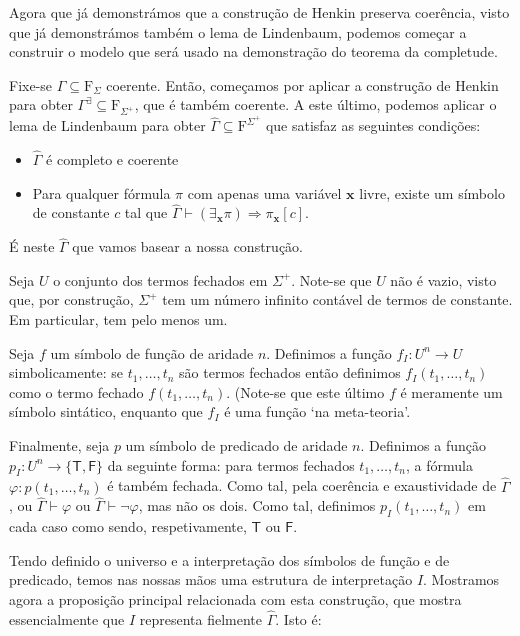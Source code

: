 \documentclass{report}
\theoremstyle{definition}
\theoremstyle{remark}
\renewcommand{\bf}[1]{\mathbf{#1}}
\newcommand{\F}{\mathrm{F}}
\newcommand{\lt}{\mathsf{T}}
\newcommand{\lf}{\mathsf{F}}
\newcommand{\imply}{\mathbin{\Rightarrow}}
\begin{document}
	Agora que já demonstrámos que a construção de Henkin preserva coerência, visto que já demonstrámos também o lema de Lindenbaum, podemos começar a construir o modelo que será usado na demonstração do teorema da completude.
	
	Fixe-se $\Gamma \subseteq \F_\Sigma$ coerente. Então, começamos por aplicar a construção de Henkin para obter $\Gamma^\exists \subseteq \F_{\Sigma^+}$, que é também coerente. A este último, podemos aplicar o lema de Lindenbaum para obter $\widehat\Gamma \subseteq \F^{\Sigma^+}$ que satisfaz as seguintes condições:
	
	\begin{itemize}
	\item $\widehat\Gamma$ é completo e coerente
	
	\item Para qualquer fórmula $\pi$ com apenas uma variável $\bf x$ livre, existe um símbolo de constante $c$ tal que $\widehat\Gamma \vdash (\exists_{\bf x} \pi) \imply \pi_{\bf x}[c]$.
	\end{itemize}
	
	É neste $\widehat\Gamma$ que vamos basear a nossa construção.
	
	Seja $U$ o conjunto dos termos fechados em $\Sigma^+$. Note-se que $U$ não é vazio, visto que, por construção, $\Sigma^+$ tem um número infinito contável de termos de constante. Em particular, tem pelo menos um.
	
	Seja $f$ um símbolo de função de aridade $n$. Definimos a função $f_I : U^n \to U$ simbolicamente: se $t_1, \dots, t_n$ são termos fechados então definimos $f_I(t_1, \dots, t_n)$ como o termo fechado $f(t_1, \dots, t_n)$. (Note-se que este último $f$ é meramente um símbolo sintático, enquanto que $f_I$ é uma função `na meta-teoria'.
	
	Finalmente, seja $p$ um símbolo de predicado de aridade $n$. Definimos a função $p_I : U^n \to \{\lt, \lf\}$ da seguinte forma: para termos fechados $t_1, \dots, t_n$, a fórmula $\varphi : p(t_1, \dots, t_n)$ é também fechada. Como tal, pela coerência e exaustividade de $\widehat\Gamma$, ou $\widehat\Gamma \vdash \varphi$ ou $\widehat\Gamma \vdash \neg\varphi$, mas não os dois. Como tal, definimos $p_I(t_1, \dots, t_n)$ em cada caso como sendo, respetivamente, $\lt$ ou $\lf$.
	
	Tendo definido o universo e a interpretação dos símbolos de função e de predicado, temos nas nossas mãos uma estrutura de interpretação $I$. Mostramos agora a proposição principal relacionada com esta construção, que mostra essencialmente que $I$ representa fielmente $\widehat\Gamma$. Isto é:
	
\end{document}
